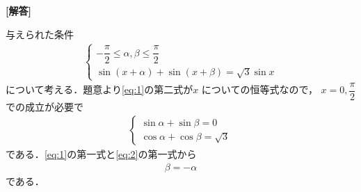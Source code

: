 \documentclass[../../main.tex]{subfiles}
\begin{document}
\begin{oframed}
  
\end{oframed}

{\bf [解答]}

与えられた条件
\begin{align}
  \begin{cases}
    -\dfrac{\pi}{2} \le \alpha, \beta \le \dfrac{\pi}{2} \\
    \sin(x+\alpha) + \sin(x+\beta) = \sqrt{3}\sin x
  \end{cases} \label{eq:1}
\end{align}
について考える．題意より\cref{eq:1}の第二式が$x$ についての恒等式なので，
$x = 0, \dfrac{\pi}{2}$ での成立が必要で
\begin{align}
  \begin{cases}
    \sin\alpha + \sin\beta = 0 \\
    \cos\alpha + \cos\beta = \sqrt{3}
  \end{cases} \label{eq:2}
\end{align}
である．\cref{eq:1}の第一式と\cref{eq:2}の第一式から
\begin{align}
  \beta = -\alpha \label{eq:3}
\end{align}
である．
\end{document}
